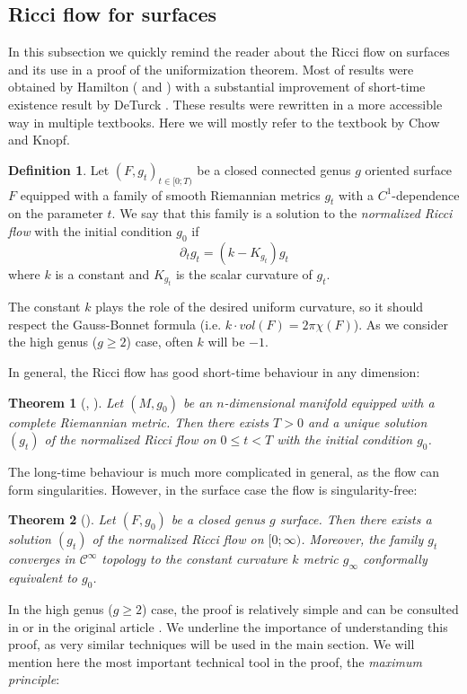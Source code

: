 \documentclass{article}
\theoremstyle{plain}
\newtheorem{thm}{Theorem}[section]
\theoremstyle{remark}
\theoremstyle{definition}
\newtheorem{defin}{Definition}[section]
\begin{document}
\subsection{Ricci flow for surfaces}
In this subsection we quickly remind the reader about the Ricci flow on surfaces and its use in a proof of the uniformization theorem. Most of results were obtained by Hamilton (\cite{Ham2} and \cite{Ham1}) with a substantial improvement of short-time existence result by DeTurck \cite{DeTurck}.
These results were rewritten in a more accessible way in multiple textbooks. Here we will mostly refer to the textbook \cite{ChowKnopf} by Chow and Knopf.
\begin{defin}
    Let $(F,g_t)_{t\in [0; T)}$ be a closed connected genus $g$ oriented surface $F$ equipped with a family of smooth Riemannian metrics $g_t$ with a $C^1$-dependence on the parameter $t$. We say that this family is a solution to the \emph{normalized Ricci flow} with the initial condition $g_0$ if 
    $$\partial_t g_t = (k-K_{g_t}) g_t$$
    where $k$ is a constant and $K_{g_t}$ is the scalar curvature of $g_t$.
\end{defin}
The constant $k$ plays the role of the desired uniform curvature, so it should respect the Gauss-Bonnet formula (i.e. $k\cdot vol(F) = 2\pi\chi(F)$). As we consider the high genus ($g\geq 2$) case, often $k$ will be $-1$. \par 
In general, the Ricci flow has good short-time behaviour in any dimension\thinspace:
\begin{thm}[\cite{Ham3}, \cite{DeTurck}]
    Let $(M, g_0)$ be an $n$-dimensional manifold equipped with a complete Riemannian metric. Then there exists $T>0$ and a unique solution $(g_t)$ of the normalized Ricci flow on $0\leq t < T$ with the initial condition $g_0$.
\end{thm}
The long-time behaviour is much more complicated in general, as the flow can form singularities. However, in the surface case the flow is singularity-free\thinspace:
\begin{thm}[\cite{Ham2}]
    Let $(F, g_0)$ be a closed genus $g$ surface. Then there exists a solution $(g_t)$ of the normalized Ricci flow on $[0;\infty)$. Moreover, the family $g_t$ converges in $\mathcal{C}^\infty$ topology to the constant curvature $k$ metric $g_\infty$ conformally equivalent to $g_0$.
\end{thm}
In the high genus ($g\geq 2$) case, the proof is relatively simple and can be consulted in \cite[Chapter 5]{ChowKnopf} or in the original article \cite{Ham1}. We underline the importance of understanding this proof, as very similar techniques will be used in the main section. We will mention here the most important technical tool in the proof, the \emph{maximum principle}\thinspace:
\end{document}

